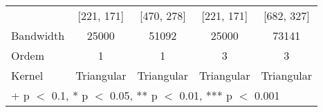 \begin{table}
\begin{tabular}[t]{lcccc}
\hspace{1em} & {}[221, 171] & {}[470, 278] & {}[221, 171] & {}[682, 327]\\
\hspace{1em}Bandwidth & 25000 & 51092 & 25000 & 73141\\
\midrule
\hspace{1em}Ordem & 1 & 1 & 3 & 3\\
\hspace{1em}Kernel & Triangular & Triangular & Triangular & Triangular\\
\bottomrule
\multicolumn{5}{l}{\rule{0pt}{1em}+ p $<$ 0.1, * p $<$ 0.05, ** p $<$ 0.01, *** p $<$ 0.001}\\
\end{tabular}
\end{table}
